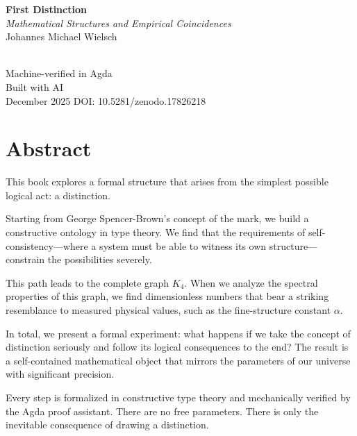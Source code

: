 \documentclass[11pt,a4paper]{book}
\begin{document}
\begin{titlepage}
\centering
\vspace*{3cm}
{\Huge\bfseries First Distinction}\\[0.5cm]
{\Large\itshape Mathematical Structures and Empirical Coincidences}\\[2cm]
{\large Johannes Michael Wielsch}\\[4cm]
\\[4cm]
{\small Machine-verified in Agda}\\
{\small Built with AI}\\
\vfill
{\small December 2025}
{\small DOI: 10.5281/zenodo.17826218}\\[0.5cm]
\end{titlepage}

\frontmatter
\chapter*{Abstract}

This book explores a formal structure that arises from the simplest possible 
logical act: a distinction.

Starting from George Spencer-Brown's concept of the mark, we build a constructive 
ontology in type theory. We find that the requirements of self-consistency---where 
a system must be able to witness its own structure---constrain the possibilities 
severely.

This path leads to the complete graph $K_4$. When we analyze the spectral 
properties of this graph, we find dimensionless numbers that bear a striking 
resemblance to measured physical values, such as the fine-structure 
constant $\alpha$.

In total, we present a formal experiment: what happens if we take the concept of 
distinction seriously and follow its logical consequences to the end? The 
result is a self-contained mathematical object that mirrors the parameters 
of our universe with significant precision.

Every step is formalized in constructive type theory and mechanically verified 
by the Agda proof assistant. There are no free parameters. There is only the 
inevitable consequence of drawing a distinction.
\end{document}

